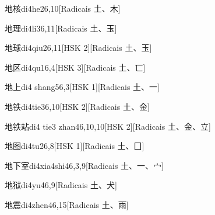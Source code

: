\begin{entry}{地核}{di4he2}{6,10}[Radicais ⼟、⽊]
\end{entry}

\begin{entry}{地理}{di4li3}{6,11}[Radicais ⼟、⽟]
\end{entry}

\begin{entry}{地球}{di4qiu2}{6,11}[HSK 2][Radicais ⼟、⽟]
\end{entry}

\begin{entry}{地区}{di4qu1}{6,4}[HSK 3][Radicais ⼟、⼖]
\end{entry}

\begin{entry}{地上}{di4 shang5}{6,3}[HSK 1][Radicais ⼟、⼀]
\end{entry}

\begin{entry}{地铁}{di4tie3}{6,10}[HSK 2][Radicais ⼟、⾦]
\end{entry}

\begin{entry}{地铁站}{di4 tie3 zhan4}{6,10,10}[HSK 2][Radicais ⼟、⾦、⽴]
\end{entry}

\begin{entry}{地图}{di4tu2}{6,8}[HSK 1][Radicais ⼟、⼞]
\end{entry}

\begin{entry}{地下室}{di4xia4shi4}{6,3,9}[Radicais ⼟、⼀、⼧]
\end{entry}

\begin{entry}{地狱}{di4yu4}{6,9}[Radicais ⼟、⽝]
\end{entry}

\begin{entry}{地震}{di4zhen4}{6,15}[Radicais ⼟、⾬]
\end{entry}

